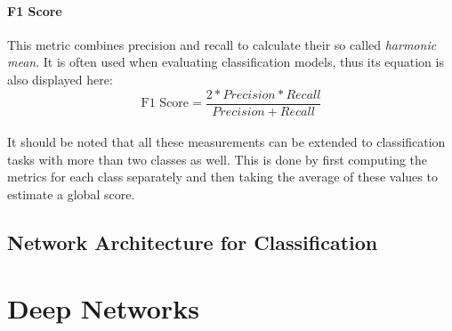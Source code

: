 \paragraph{F1 Score} This metric combines precision and recall to
calculate their so called \textit{harmonic mean}. It is often used
when evaluating classification models, thus its equation is also
displayed here:
\begin{equation}
  \text{F1 Score} = \frac{2*Precision*Recall}{Precision+Recall}
\end{equation}
\\
It should be noted that all these measurements can be extended to
classification tasks with more than two classes as well. This is done
by first computing the metrics for each class separately and then
taking the average of these values to estimate a global score.

\subsection{Network Architecture for Classification}

\section{Deep Networks}
